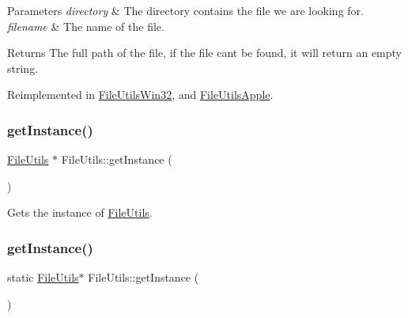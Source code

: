 \begin{DoxyParams}{Parameters}
{\em directory} & The directory contains the file we are looking for. \\
\hline
{\em filename} & The name of the file. \\
\hline
\end{DoxyParams}
\begin{DoxyReturn}{Returns}
The full path of the file, if the file can\textquotesingle{}t be found, it will return an empty string. 
\end{DoxyReturn}


Reimplemented in \hyperlink{classFileUtilsWin32_a724a4ac17310d89813bf96180321dfb2}{File\+Utils\+Win32}, and \hyperlink{classFileUtilsApple_aa05388c597ff89171e955808338de05e}{File\+Utils\+Apple}.

\mbox{\label{classFileUtils_ac8ced4394d59f5459445ced27ccd0e8a}} 
\subsubsection{\texorpdfstring{get\+Instance()}{getInstance()}\hspace{0.1cm}{\footnotesize\ttfamily [1/2]}}
{\footnotesize\ttfamily \hyperlink{classFileUtils}{File\+Utils} $\ast$ File\+Utils\+::get\+Instance (\begin{DoxyParamCaption}{ }\end{DoxyParamCaption})\hspace{0.3cm}{\ttfamily [static]}}

Gets the instance of \hyperlink{classFileUtils}{File\+Utils}. \mbox{\label{classFileUtils_a4a0874cba0ed3d182b0b48b926ce529c}} 
\subsubsection{\texorpdfstring{get\+Instance()}{getInstance()}\hspace{0.1cm}{\footnotesize\ttfamily [2/2]}}
{\footnotesize\ttfamily static \hyperlink{classFileUtils}{File\+Utils}$\ast$ File\+Utils\+::get\+Instance (\begin{DoxyParamCaption}{ }\end{DoxyParamCaption})\hspace{0.3cm}{\ttfamily [static]}}


